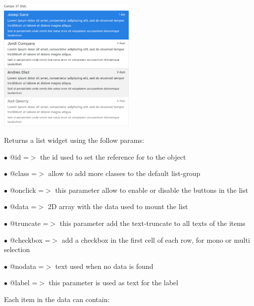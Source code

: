 \documentclass[a4paper]{article}
\begin{document}
\begin{center}\includegraphics[width=0.5\textwidth]{../ujest/snaps/test-bootstrap-js-bootstrap-campo-37-list-1-snap.png}\end{center}

Returns a list widget using the follow params:

\begin{compactitem}
\item[\color{myblue}$\bullet$] @id       =$>$ the id used to set the reference for to the object
\item[\color{myblue}$\bullet$] @class    =$>$ allow to add more classes to the default list-group
\item[\color{myblue}$\bullet$] @onclick  =$>$ this parameter allow to enable or disable the buttons in the list
\item[\color{myblue}$\bullet$] @data     =$>$ 2D array with the data used to mount the list
\item[\color{myblue}$\bullet$] @truncate =$>$ this parameter add the text-truncate to all texts of the items
\item[\color{myblue}$\bullet$] @checkbox =$>$ add a checkbox in the first cell of each row, for mono or multi selection
\item[\color{myblue}$\bullet$] @nodata   =$>$ text used when no data is found
\item[\color{myblue}$\bullet$] @label    =$>$ this parameter is used as text for the label
\end{compactitem}

Each item in the data can contain:
\end{document}
